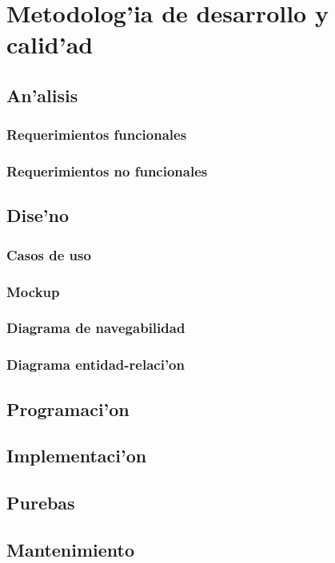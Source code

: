 \chapter{Metodolog'ia de desarrollo y calid'ad}
\section{An'alisis}
\subsection{Requerimientos funcionales}

\subsection{Requerimientos no funcionales}

\section{Dise'no}
\subsection{Casos de uso}

\subsection{Mockup}

\subsection{Diagrama de navegabilidad}

\subsection{Diagrama entidad-relaci'on}

\section{Programaci'on}

\section{Implementaci'on}

\section{Purebas}

\section{Mantenimiento}
